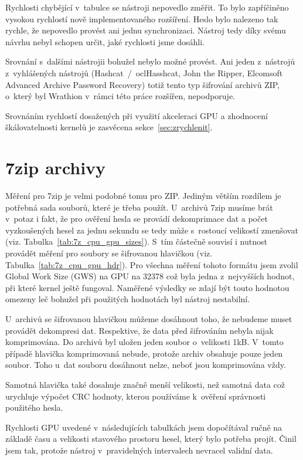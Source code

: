 \shorthandon{-}
\noindent Rychlosti chybějící v~tabulce se nástroji nepovedlo změřit. To bylo zapříčiněno vysokou rychlostí
nově implementovaného rozšíření. Heslo bylo nalezeno tak rychle, že nepovedlo provést ani jednu
synchronizaci. Nástroj tedy díky svému návrhu nebyl schopen určit, jaké rychlosti jsme dosáhli.

Srovnání s~dalšími nástrojii bohužel nebylo možné provést. Ani jeden z~nástrojů z~vyhlášených
nástrojů (Hashcat~/~oclHasshcat, John the Ripper, Elcomsoft Advanced Archive Password Recovery)
totiž tento typ šifrování archivů ZIP, o~který byl Wrathion v~rámci této práce rozšířen,
nepodporuje.

Srovnáním rychlostí dosažených při využití akceleraci GPU a zhodnocení škálovatelnosti kernelů je zasvěcena sekce~\ref{sec:zrychlenit}. 

\section{7zip archivy}
Měření pro 7zip je velmi podobné tomu pro ZIP. Jediným větším rozdílem je potřebná sada souborů, které
je třeba použít. U~archivů 7zip musíme brát v~potaz i fakt, že pro ověření hesla se provádí
dekomprimace dat a počet vyzkoušených hesel za jednu sekundu se tedy může s~rostoucí velikostí
zmenšovat (viz. Tabulka~\ref{tab:7z_cpu_gpu_sizes}). S~tím částečně souvisí i nutnost provádět
měření pro soubory se šifrovanou hlavičkou (viz. Tabulka~\ref{tab:7z_cpu_gpu_hdr}). Pro všechna
měření tohoto formátu jsem zvolil Global Work Size (GWS) na GPU na 32378 což byla jedna
z~nejvyšších hodnot, při které kernel ještě fungoval. Naměřené výsledky se zdají být touto hodnotou
omezeny leč bohužel při použitých hodnotách byl nástroj nestabilní.

U~archivů se šifrovanou hlavičkou můžeme dosáhnout toho, že nebudeme muset provádět dekompresi
dat. Respektive, že data před šifrováním nebyla nijak komprimována. Do archivů byl uložen
jeden soubor o~velikosti 1kB. V~tomto případě hlavička komprimovaná nebude, protože archiv
obsahuje pouze jeden soubor. Toho u~dat souboru dosáhnout nelze, neboť jsou komprimována vždy.

Samotná hlavička také dosahuje značně menší velikosti, než samotná data což urychluje výpočet CRC
hodnoty, kterou používáme k~ověření správnosti použitého hesla.

Rychlosti GPU uvedené v~následujících tabulkách jsem dopočítával ručně na základě času a
velikosti stavového prostoru hesel, který bylo potřeba projít. Činil jsem tak, protože nástroj
v~pravidelných intervalech nevracel validní data.

